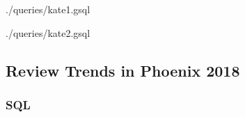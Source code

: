 

{./queries/kate1.gsql}



{./queries/kate2.gsql}

\subsection{Review Trends in Phoenix 2018}

\subsubsection{SQL}

